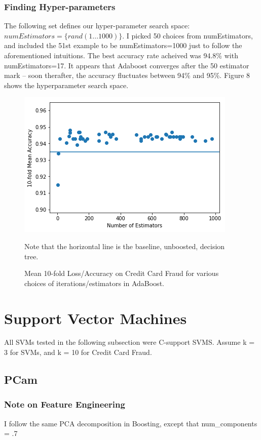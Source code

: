 \documentclass[a4paper]{article}
\begin{document}
\subsubsection{Finding Hyper-parameters}
The following set defines our hyper-parameter search space: $numEstimators = \{rand(1...1000)\}$. I picked 50 choices from numEstimators, and included the 51st example to be numEstimators=1000 just to follow the aforementioned intuitions. The best accuracy rate acheived was 94.8\% with numEstimators=17. It appears that Adaboost converges after the 50 estimator mark -- soon therafter, the accuracy fluctuates between 94\% and 95\%. Figure 8 shows the hyperparameter search space.
\begin{figure}
  \centering
  \includegraphics[width=.6\textwidth]{images/boosting_acc.png}
  \caption{Mean 10-fold Loss/Accuracy on Credit Card Fraud for various choices of iterations/estimators in AdaBoost.}
  {Note that the horizontal line is the baseline, unboosted, decision tree.}
\end{figure}
\section{Support Vector Machines}
All SVMs tested in the following subsection were C-support SVMS. Assume k = 3 for SVMs, and k = 10 for Credit Card Fraud.
\subsection{PCam}
\subsubsection{Note on Feature Engineering}
I follow the same PCA decomposition in Boosting, except that num\_components = .7
\end{document}
